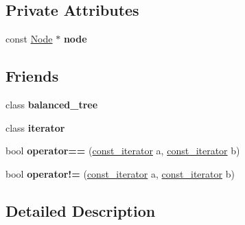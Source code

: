 \subsection*{Private Attributes}
\begin{DoxyCompactItemize}
\item 
\hypertarget{classbalanced__tree_1_1const__iterator_af8e2831b1e91e935f6ae0e2705a8a970}{const \hyperlink{structbalanced__tree_1_1Node}{Node} $\ast$ {\bfseries node}}\label{classbalanced__tree_1_1const__iterator_af8e2831b1e91e935f6ae0e2705a8a970}

\end{DoxyCompactItemize}
\subsection*{Friends}
\begin{DoxyCompactItemize}
\item 
\hypertarget{classbalanced__tree_1_1const__iterator_a080cd3957bad1460e07534ae55222a40}{class {\bfseries balanced\+\_\+tree}}\label{classbalanced__tree_1_1const__iterator_a080cd3957bad1460e07534ae55222a40}

\item 
\hypertarget{classbalanced__tree_1_1const__iterator_a67171474c4da6cc8efe0c7fafefd2b2d}{class {\bfseries iterator}}\label{classbalanced__tree_1_1const__iterator_a67171474c4da6cc8efe0c7fafefd2b2d}

\item 
\hypertarget{classbalanced__tree_1_1const__iterator_acc23b862dd0fc90fb4bd8861f70915e3}{bool {\bfseries operator==} (\hyperlink{classbalanced__tree_1_1const__iterator}{const\+\_\+iterator} a, \hyperlink{classbalanced__tree_1_1const__iterator}{const\+\_\+iterator} b)}\label{classbalanced__tree_1_1const__iterator_acc23b862dd0fc90fb4bd8861f70915e3}

\item 
\hypertarget{classbalanced__tree_1_1const__iterator_a7940e7d7e8292acb3c360c32b9eb00e9}{bool {\bfseries operator!=} (\hyperlink{classbalanced__tree_1_1const__iterator}{const\+\_\+iterator} a, \hyperlink{classbalanced__tree_1_1const__iterator}{const\+\_\+iterator} b)}\label{classbalanced__tree_1_1const__iterator_a7940e7d7e8292acb3c360c32b9eb00e9}

\end{DoxyCompactItemize}


\subsection{Detailed Description}
